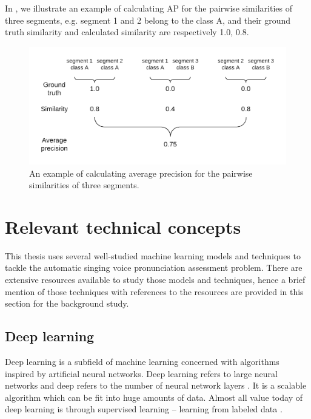 In , we illustrate an example of calculating \gls{AP} for the pairwise similarities of three segments, e.g. segment 1 and 2 belong to the class A, and their ground truth similarity and calculated similarity are respectively 1.0, 0.8.

\begin{figure}[ht!]
\includegraphics[width=\textwidth]{figs/blockDiags_rong/ch2_average_precision.png}
\caption{An example of calculating average precision for the pairwise similarities of three segments.}
\label{fig:ch2_average_precision}
\end{figure}

\section{Relevant technical concepts}

This thesis uses several well-studied machine learning models and techniques to tackle the automatic singing voice pronunciation assessment problem. There are extensive resources available to study those models and techniques, hence a brief mention of those techniques with references to the resources are provided in this section for the background study.

\subsection{Deep learning}

Deep learning is a subfield of machine learning concerned with algorithms inspired by artificial neural networks. Deep learning refers to large neural networks and deep refers to the number of neural network layers \cite{Dean}. It is a scalable algorithm which can be fit into huge amounts of data. Almost all value today of deep learning is through supervised learning -- learning from labeled data \cite{Ng}. 


